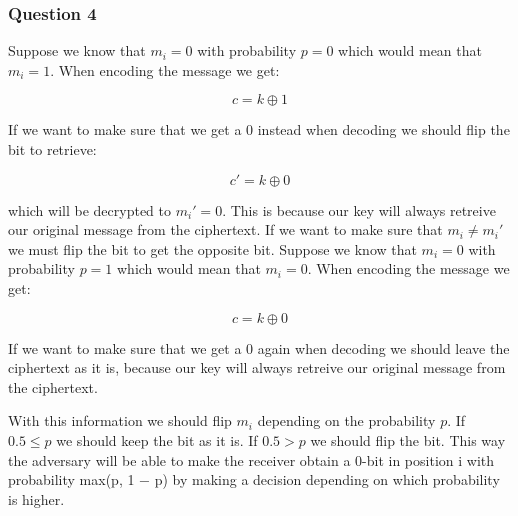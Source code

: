 \documentclass[
  paper=a4,
  ,captions=tableheading
]{scrartcl}
\begin{document}
\hypertarget{question-4}{%
\subsubsection{Question 4}\label{question-4}}

Suppose we know that \(m_i=0\) with probability \(p=0\) which would mean
that \(m_i=1\). When encoding the message we get:

\[
c= k\oplus 1
\]

If we want to make sure that we get a 0 instead when decoding we should
flip the bit to retrieve:

\[
c'= k\oplus 0
\]

which will be decrypted to \(m_i'=0\). This is because our key will
always retreive our original message from the ciphertext. If we want to
make sure that \(m_i\neq m_i'\) we must flip the bit to get the opposite
bit. Suppose we know that \(m_i=0\) with probability \(p=1\) which would
mean that \(m_i=0\). When encoding the message we get:

\[
c= k\oplus 0
\]

If we want to make sure that we get a 0 again when decoding we should
leave the ciphertext as it is, because our key will always retreive our
original message from the ciphertext.

With this information we should flip \(m_i\) depending on the
probability \(p\). If \(0.5\leq p\) we should keep the bit as it is. If
\(0.5>p\) we should flip the bit. This way the adversary will be able to
make the receiver obtain a 0-bit in position i with probability max(p, 1
− p) by making a decision depending on which probability is higher.
\end{document}
